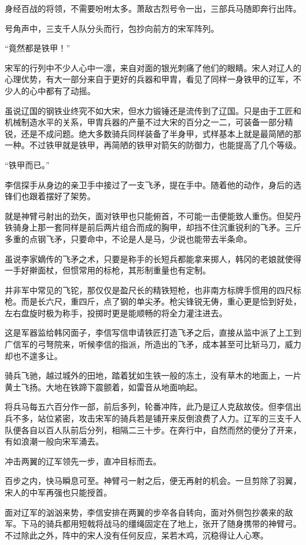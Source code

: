 身经百战的将领，不需要吩咐太多。萧敌古烈号令一出，三部兵马随即奔行出阵。

号角声中，三支千人队分头而行，包抄向前方的宋军阵列。

“竟然都是铁甲！”

宋军的行列中不少人心中一凛，来自对面的银光刺痛了他们的眼睛。宋人对辽人的心理优势，有大一部分来自于更好的兵器和甲胄，看见了同样一身铁甲的辽军，不少人的心中都有了动摇。

虽说辽国的钢铁业终究不如大宋，但水力锻锤还是流传到了辽国。只是由于工匠和机械制造水平的关系，甲胄兵器的产量不过大宋的百分之一二，可装备一部分精锐，还是不成问题。绝大多数骑兵同样装备了半身甲，式样基本上就是最简陋的那一种。不过铁甲就是铁甲，再简陋的铁甲对箭矢的防御力，也能提高了几个等级。

“铁甲而已。”

李信探手从身边的亲卫手中接过了一支飞矛，提在手中。随着他的动作，身后的选锋们也跟着摆好了架势。

就是神臂弓射出的劲矢，面对铁甲也只能俯首，不可能一击便能致人重伤。但契丹铁骑身上那一套同样是前后两片组合而成的胸甲，却挡不住沉重锐利的飞矛。三斤多重的点钢飞矛，只要命中，不论是人是马，少说也能带去半条命。

虽说李家嫡传的飞矛之术，只要是称手的长短兵都能拿来掷人，韩冈的老娘就使得一手好擀面杖，但惯常用的标枪，其形制重量也有定制。

并非军中常见的飞铊，那仅仅是盈尺长的精铁短枪，也非南方标牌手惯用的四尺标枪。而是长六尺，重四斤，点了钢的单尖矛。枪尖锋锐无俦，重心更是恰到好处，左右盘旋时极为称手，投掷时更是能顺畅的将全力灌注进去。

这是军器监给韩冈面子，李信写信申请铁匠打造飞矛之后，直接从监中派了上工到广信军的弓弩院来，听候李信的指派，所造出的飞矛，成本甚至可比斩马刀，威力却也不遑多让。

骑兵飞驰，越过城外的田地，踏着犹如生铁一般的冻土，没有草木的地面上，一片黄土飞扬。大地在铁蹄下震颤着，如雷音从地面响起。

将兵马每五六百分作一部，前后多列，轮番冲阵，此乃是辽人克敌故伎。但李信出兵不多，站位紧密，攻击宋军的骑兵若是铺开来反倒浪费了人力。辽军的三支千人队便各自以百人队前后分列，相隔二三十步。在奔行中，自然而然的便分了开来，有如浪潮一般向宋军涌去。

冲击两翼的辽军领先一步，直冲目标而去。

百步之内，快马瞬息可至。神臂弓一射之后，便无再射的机会。一旦剪除了羽翼，宋人的中军再强也只能授首。

面对辽军的汹汹来势，李信安排在两翼的步卒各自转向，面对外侧包抄袭来的敌军。下马的骑兵都用短戟将战马的缰绳固定在了地上，张开了随身携带的神臂弓。不过除此之外，阵中的宋人没有任何反应，呆若木鸡，沉稳得让人心寒。

